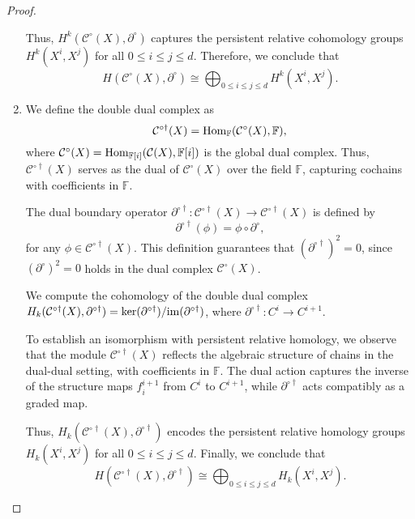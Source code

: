 \begin{proof}
\begin{enumerate}
Thus, \( H^k(\mathcal{C}^\circ(X), \partial^\circ) \) captures the persistent relative cohomology groups \( H^k(X^i, X^j) \) for all \( 0 \leq i \leq j \leq d \). Therefore, we conclude that
\[
H(\mathcal{C}^\circ(X), \partial^\circ) \cong \bigoplus_{0 \leq i \leq j \leq d} H^k(X^i, X^j).
\]

\item We define the double dual complex as 
\[
\mathcal{C}^{\circ\dagger}(X) = {\mathrm{Hom}}_{\mathbb{F}}(\mathcal{C}^\circ(X), {\mathbb{F}}),
\]
where \( \mathcal{C}^\circ(X) = {\mathrm{Hom}}_{\mathbb{F}[i]}(\mathcal{C}(X), \mathbb{F}[i]) \) is the global dual complex. Thus, \( \mathcal{C}^{\circ\dagger}(X) \) serves as the dual of \( \mathcal{C}^\circ(X) \) over the field \( \mathbb{F} \), capturing cochains with coefficients in \( \mathbb{F} \).

The dual boundary operator \( \partial^{\circ\dagger}: \mathcal{C}^{\circ\dagger}(X) \to \mathcal{C}^{\circ\dagger}(X) \) is defined by
\[
\partial^{\circ\dagger}(\phi) = \phi \circ \partial^\circ,
\]
for any \( \phi \in \mathcal{C}^{\circ\dagger}(X) \). This definition guarantees that $(\partial^{\circ\dagger})^2 = 0$, since \( (\partial^\circ)^2 = 0 \) holds in the dual complex \( \mathcal{C}^\circ(X) \).

We compute the cohomology of the double dual complex $H_k(\mathcal{C}^{\circ\dagger}(X), \partial^{\circ\dagger}) = \ker(\partial^{\circ\dagger}) / \mathrm{im}(\partial^{\circ\dagger})$, where \( \partial^{\circ\dagger}: C^i \to C^{i+1} \).

To establish an isomorphism with persistent relative homology, we observe that the module \( \mathcal{C}^{\circ\dagger}(X) \) reflects the algebraic structure of chains in the dual-dual setting, with coefficients in \( \mathbb{F} \). The dual action captures the inverse of the structure maps \( f_{i}^{i+1} \) from \( C^i \) to \( C^{i+1} \), while \( \partial^{\circ\dagger} \) acts compatibly as a graded map.

Thus, \( H_k(\mathcal{C}^{\circ\dagger}(X), \partial^{\circ\dagger}) \) encodes the persistent relative homology groups \( H_k(X^i, X^j) \) for all \( 0 \leq i \leq j \leq d \). Finally, we conclude that 
\[
H(\mathcal{C}^{\circ\dagger}(X), \partial^{\circ\dagger}) \cong \bigoplus_{0 \leq i \leq j \leq d} H_k(X^i, X^j).
\]
\end{enumerate}
\end{proof}

